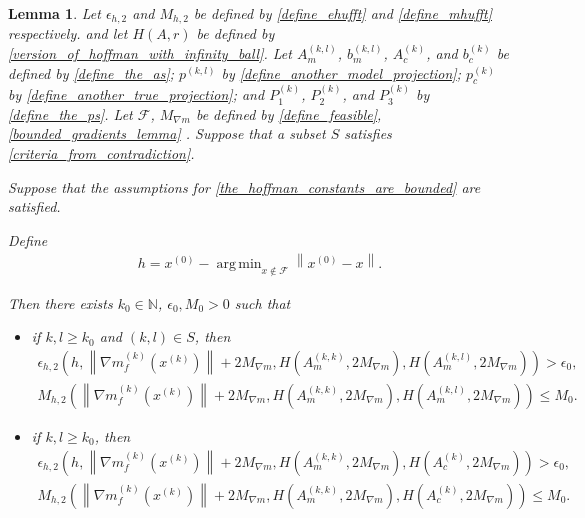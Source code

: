\documentclass{article}
\newtheorem{lemma}[theorem]{Lemma}
\theoremstyle{case}
\numberwithin{theorem}{subsection}
\DeclareMathOperator*{\argmin}{arg\,min}
\newcommand{\feasible}{{\mathcal F}}
\newcommand{\gk}{{\nabla m_f^{(k)}\left(\xk\right)}}
\newcommand{\naturals}{\mathbb N}
\newcommand{\xk}{x^{(k)}}
\newcommand{\xinit}{{x^{(0)}}}
\newcommand{\projkl}{{p^{(k,l)}}}
\newcommand{\trueprojk}{{p_c^{(k)}}}
\newcommand{\maxmodelgrad}{{M_{\nabla m}}}
\begin{document}
\begin{lemma}
\label{its_all_bounded}
Let $\epsilon_{h, 2}$ and $M_{h, 2}$ be defined by \cref{define_ehufft} and \cref{define_mhufft} respectively.
and let $H(A, r)$ be defined by \cref{version_of_hoffman_with_infinity_ball}.
Let $A_{m}^{(k, l)}$, $b_{m}^{(k, l)}$, $A_{c}^{(k)}$, and $b_{c}^{(k)}$ be defined by \cref{define_the_as};
$\projkl$ by \cref{define_another_model_projection};
$\trueprojk$ by \cref{define_another_true_projection};
and $P^{(k)}_1$, $P^{(k)}_2$, and $P^{(k)}_3$ by \cref{define_the_ps}.
Let
$\feasible$, $\maxmodelgrad$
be defined by
\cref{define_feasible},
\cref{bounded_gradients_lemma}
.
Suppose that a subset $S$ satisfies \cref{criteria_from_contradiction}.

Suppose that the assumptions for \cref{the_hoffman_constants_are_bounded} are satisfied.

Define 
\begin{align*}
h = \xinit - \argmin_{x \not \in \feasible} \left\|\xinit - x\right\|.
\end{align*}

Then there exists $k_0 \in \naturals$, $\epsilon_0, M_0 > 0$ such that
\begin{itemize}
\item if $k, l \ge k_0$ and $(k, l) \in S$, then
\begin{align*}
\epsilon_{h, 2}\left(h, \left\|\gk\right\| + 2 \maxmodelgrad, H\left(A_{m}^{(k, k)}, 2 \maxmodelgrad\right), H\left(A_{m}^{(k, l)}, 2 \maxmodelgrad\right)\right) > \epsilon_0, \\
         M_{h, 2} \left(\left\|\gk\right\| + 2 \maxmodelgrad, H\left(A_{m}^{(k, k)}, 2 \maxmodelgrad\right), H\left(A_{m}^{(k, l)}, 2 \maxmodelgrad\right)\right) \le M_0.
\end{align*}
\item if $k, l \ge k_0$, then
\begin{align*}
\epsilon_{h, 2}\left(h, \left\|\gk\right\| + 2 \maxmodelgrad, H\left(A_{m}^{(k, k)}, 2 \maxmodelgrad\right), H\left(A_{c}^{(k)}, 2 \maxmodelgrad\right)\right) > \epsilon_0, \\
		 M_{h, 2} \left(\left\|\gk\right\| + 2 \maxmodelgrad, H\left(A_{m}^{(k, k)}, 2 \maxmodelgrad\right), H\left(A_{c}^{(k)}, 2 \maxmodelgrad\right)\right) \le M_0.
\end{align*}
\end{itemize}
\end{lemma}
\end{document}
